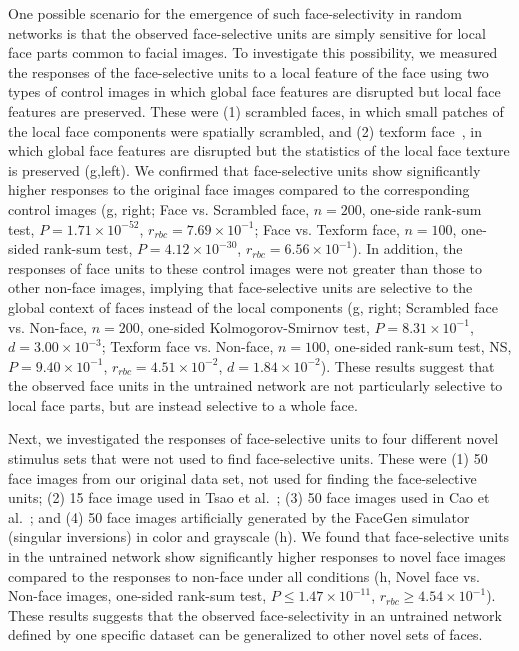 \documentclass[sn-mathphys]{sn-jnl}%
\theoremstyle{thmstyleone}%
\theoremstyle{thmstyletwo}%
\theoremstyle{thmstylethree}%
\begin{document}
One possible scenario for the emergence of such face-selectivity in random networks is that the observed face-selective units are simply sensitive for local face parts common to facial images.
To investigate this possibility, we measured the responses of the face-selective units to a local feature of the face using two types of control images in which global face features are disrupted but local face features are preserved.
These were (1) scrambled faces, in which small patches of the local face components were spatially scrambled, and (2) texform face~\cite{long2018mid}, in which global face features are disrupted but the statistics of the local face texture is preserved (g,left).
We confirmed that face-selective units show significantly higher responses to the original face images compared to the corresponding control images (g, right; 
Face vs. Scrambled face, $ n=200 $, one-side rank-sum test, $ P=1.71 \times 10^{-52} $, $ r_{rbc}=7.69 \times 10^{-1} $;
Face vs. Texform face, $ n=100 $, one-sided rank-sum test, $ P=4.12\times10^{-30} $, $ r_{rbc}=6.56\times 10^{-1} $).
In addition, the responses of face units to these control images were not greater than those to other non-face images, implying that face-selective units are selective to the global context of faces instead of the local components (g, right; Scrambled face vs. Non-face, $ n=200 $, one-sided Kolmogorov-Smirnov test, $ P=8.31 \times 10^{-1} $, $ d=3.00 \times 10^{-3} $; 
Texform face vs. Non-face, $ n=100 $, one-sided rank-sum test, NS, $ P=9.40 \times 10^{-1} $, $ r_{rbc}=4.51 \times 10^{-2} $, $ d=1.84 \times 10^{-2} $).
These results suggest that the observed face units in the untrained network are not particularly selective to local face parts, but are instead selective to a whole face.


Next, we investigated the responses of face-selective units to four different novel stimulus sets that were not used to find face-selective units.
These were
(1) 50 face images from our original data set, not used for finding the face-selective units;
(2) 15 face image used in Tsao et al.~\cite{tsao2006cortical,freiwald2010functional};
(3) 50 face images used in Cao et al.~\cite{cao2018vggface2};
and (4) 50 face images artificially generated by the FaceGen simulator (singular inversions) in color and grayscale (h).
We found that face-selective units in the untrained network show significantly higher responses to novel face images compared to the responses to non-face under all conditions (h, Novel face vs. Non-face images, one-sided rank-sum test, $ P \leq 1.47 \times 10^{-11} $, $ r_{rbc} \geq 4.54 \times 10^{-1}$).
These results suggests that the observed face-selectivity in an untrained network defined by one specific dataset can be generalized to other novel sets of faces.
\end{document}
